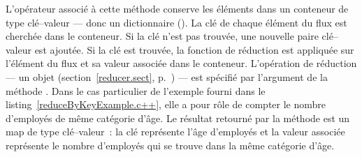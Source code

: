 L'opérateur  associ\'e \`a cette m\'ethode conserve les \'el\'ements dans un conteneur de type cl\'e--valeur --- donc un dictionnaire (). La cl\'e de chaque \'el\'ement du flux est cherch\'ee dans le conteneur. Si la cl\'e n'est pas trouv\'ee, une nouvelle paire cl\'e--valeur est ajout\'ee. Si la cl\'e est trouv\'ee, la fonction de r\'eduction est appliqu\'ee sur l'\'el\'ement du flux et sa valeur associ\'ee dans le conteneur. L'op\'eration de r\'eduction --- un objet  (section~\ref{reducer.sect}, p.~\pageref{reducer.sect})  --- est sp\'ecifi\'e par l'argument de la m\'ethode . Dans le cas particulier de l'exemple fourni dans le listing~\ref{reduceByKeyExample.c++}, elle a pour r\^ole de compter le nombre d'employ\'es de m\^eme catégorie d'\^age. Le r\'esultat retourn\'e par la m\'ethode  est un map de type cl\'e--valeur~: la cl\'e repr\'esente l'\^age d'employ\'es et la valeur associ\'ee repr\'esente le nombre d'employ\'es qui se trouve dans la m\^eme cat\'egorie d'\^age.
